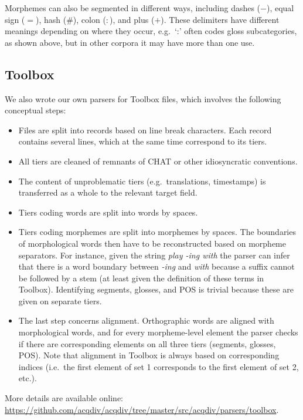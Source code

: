 \documentclass[a4paper, 11pt]{book}
\begin{document}
Morphemes can also be segmented in different ways, including dashes ($-$), equal sign ($=$), hash ($\#$), colon ($:$), and plus ($+$). These delimiters have different meanings depending on where they occur, e.g.\ `:' often codes gloss subcategories, as shown above, but in other corpora it may have more than one use.


\subsection{Toolbox}

We also wrote our own parsers for Toolbox files, which involves the following conceptual steps: 

\begin{itemize}
	\item Files are split into records based on line break characters. Each record contains several lines, which at the same time correspond to its tiers. 
	\item All tiers are cleaned of remnants of CHAT or other idiosyncratic conventions. 
	\item The content of unproblematic tiers (e.g.\ translations, timestamps) is transferred as a whole to the relevant target field. 
	\item Tiers coding words are split into words by spaces. 
	\item Tiers coding morphemes are split into morphemes by spaces. The boundaries of morphological words then have to be reconstructed based on morpheme separators. For instance, 
		given the string \emph{play -ing with} the parser can infer that there is a word boundary between \emph{-ing} and \emph{with} because a suffix cannot be followed by a stem
		(at least given the definition of these terms in Toolbox). Identifying segments, glosses, and POS is trivial because these are given on separate tiers. 
	\item The last step concerns alignment. Orthographic words are aligned with morphological words, and for every morpheme-level element the parser checks if there are corresponding 
		elements on all three tiers (segments, glosses, POS). Note that alignment in Toolbox is always based on corresponding indices (i.e.\ the first element of set 1 corresponds to
		the first element of set 2, etc.).
\end{itemize}

More details are available online: \url{https://github.com/acqdiv/acqdiv/tree/master/src/acqdiv/parsers/toolbox}.
\end{document}
